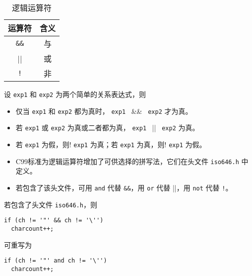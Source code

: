 \begin{frame}[fragile]\ft{\secname}
\begin{table}
\centering
\caption{逻辑运算符}
\begin{tabular}{c|c}\hline\hline
运算符&含义 \\\hline
\lstinline|&&| & 与  \\[0.1in]
|| & 或  \\[0.1in]
\lstinline|!| & 非  \\\hline\hline
\end{tabular}
\end{table} \pause 

设 \lstinline|exp1| 和 \lstinline|exp2| 为两个简单的关系表达式，则 \vspace{0.1in}

\begin{itemize}
\item 仅当 \lstinline|exp1| 和 \lstinline|exp2| 都为真时， \lstinline|exp1| ~\&\&~ \lstinline|exp2| 才为真。\\[0.2in]
\item 若 \lstinline|exp1| 或 \lstinline|exp2| 为真或二者都为真， \lstinline|exp1| ~||~ \lstinline|exp2| 为真。\\[0.2in]
\item 若 \lstinline|exp1| 为假，则! \lstinline|exp1| 为真；若 \lstinline|exp1| 为真，则! \lstinline|exp1| 为假。
\end{itemize}
\end{frame}

\begin{frame}[fragile]
\begin{itemize}
\item 
C99标准为逻辑运算符增加了可供选择的拼写法，它们在头文件 \lstinline|iso646.h| 中定义。\\[0.1in]
\item 若包含了该头文件，可用 \lstinline|and| 代替 \lstinline|&&|，用 \lstinline|or| 代替 ||，用 \lstinline|not| 代替 \lstinline|!|。
\end{itemize}
\pause 

若包含了头文件 \lstinline|iso646.h|，则
\begin{lstlisting}
if (ch != '"' && ch != '\'')
  charcount++;
\end{lstlisting}
可重写为
\begin{lstlisting}
if (ch != '"' and ch != '\'')
  charcount++;
\end{lstlisting}
\end{frame}


